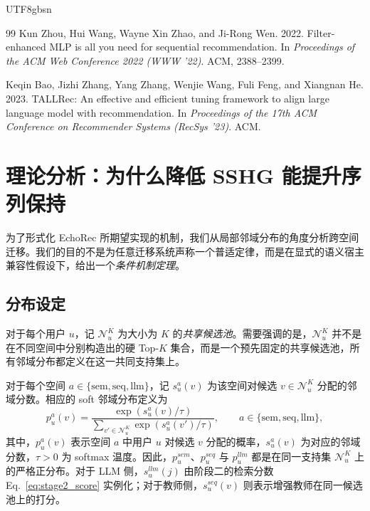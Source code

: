 \documentclass{article}
\begin{document}
\begin{CJK*}{UTF8}{gbsn}
\begin{thebibliography}{99}
Kun Zhou, Hui Wang, Wayne Xin Zhao, and Ji-Rong Wen. 2022.
Filter-enhanced MLP is all you need for sequential recommendation.
In \textit{Proceedings of the ACM Web Conference 2022 (WWW '22)}. ACM, 2388--2399.

Keqin Bao, Jizhi Zhang, Yang Zhang, Wenjie Wang, Fuli Feng, and Xiangnan He. 2023.
TALLRec: An effective and efficient tuning framework to align large language model with recommendation.
In \textit{Proceedings of the 17th ACM Conference on Recommender Systems (RecSys '23)}. ACM.

\end{thebibliography}



\appendix

\section{理论分析：为什么降低 SSHG 能提升序列保持}
\label{app:theory}

为了形式化 EchoRec 所期望实现的机制，我们从局部邻域分布的角度分析跨空间迁移。我们的目的不是为任意迁移系统声称一个普适定律，而是在显式的语义宿主兼容性假设下，给出一个\emph{条件机制定理}。

\subsection{分布设定}
\label{app:theory_setup}

对于每个用户 $u$，记 $\mathcal{N}_u^K$ 为大小为 $K$ 的\emph{共享候选池}。需要强调的是，$\mathcal{N}_u^K$ 并不是在不同空间中分别构造出的硬 Top-$K$ 集合，而是一个预先固定的共享候选池，所有邻域分布都定义在这一共同支持集上。

对于每个空间 $a \in \{\mathrm{sem}, \mathrm{seq}, \mathrm{llm}\}$，记 $s_u^a(v)$ 为该空间对候选 $v \in \mathcal{N}_u^K$ 分配的邻域分数。相应的 soft 邻域分布定义为
\begin{equation}
p_u^a(v)
=
\frac{\exp(s_u^a(v)/\tau)}
{\sum_{v' \in \mathcal{N}_u^K}\exp(s_u^a(v')/\tau)},
\qquad
a \in \{\mathrm{sem}, \mathrm{seq}, \mathrm{llm}\},
\label{eq:soft_dist}
\end{equation}
其中，$p_u^a(v)$ 表示空间 $a$ 中用户 $u$ 对候选 $v$ 分配的概率，$s_u^a(v)$ 为对应的邻域分数，$\tau>0$ 为 softmax 温度。因此，$p_u^{sem}$、$p_u^{seq}$ 与 $p_u^{llm}$ 都是在同一支持集 $\mathcal{N}_u^K$ 上的严格正分布。对于 LLM 侧，$s_u^{llm}(j)$ 由阶段二的检索分数 Eq.~\eqref{eq:stage2_score} 实例化；对于教师侧，$s_u^{seq}(v)$ 则表示增强教师在同一候选池上的打分。


\end{CJK*}
\end{document}
